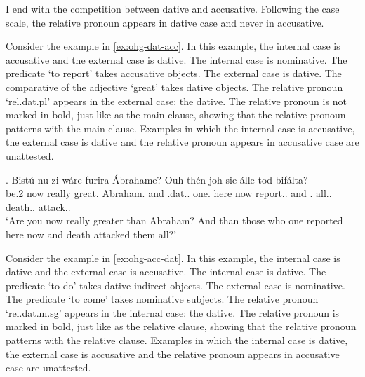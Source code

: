 I end with the competition between dative and accusative. Following the case scale, the relative pronoun appears in dative case and never in accusative.

Consider the example in \ref{ex:ohg-dat-acc}. In this example, the internal case is accusative and the external case is dative.
The internal case is nominative. The predicate  `to report' takes accusative objects.
The external case is dative. The comparative of the adjective  `great' takes dative objects.
The relative pronoun  `\ac{rel}.\ac{dat}.\ac{pl}' appears in the external case: the dative. The relative pronoun is not marked in bold, just like as the main clause, showing that the relative pronoun patterns with the main clause.
Examples in which the internal case is accusative, the external case is dative and the relative pronoun appears in accusative case are unattested.

\exg. Bistú nu {zi wáre} furira Ábrahame? Ouh thén     joh sie álle tod bifálta?\\
{be.2 } now really {great}.\scsub{[dat]} Abraham. and .\ac{dat}.. one. here now report..\scsub{[acc]}
and . all.. death.. attack..\\
`Are you now really greater than Abraham? And than those who one reported here now and death attacked them all?' \label{ex:ohg-dat-acc}

Consider the example in \ref{ex:ohg-acc-dat}. In this example, the internal case is dative and the external case is accusative.
The internal case is dative. The predicate  `to do' takes dative indirect objects.
The external case is nominative. The predicate  `to come' takes nominative subjects.
The relative pronoun  `\ac{rel}.\ac{dat}.\ac{m}.\ac{sg}' appears in the internal case: the dative. The relative pronoun is marked in bold, just like as the relative clause, showing that the relative pronoun patterns with the relative clause.
Examples in which the internal case is dative, the external case is accusative and the relative pronoun appears in accusative case are unattested.



